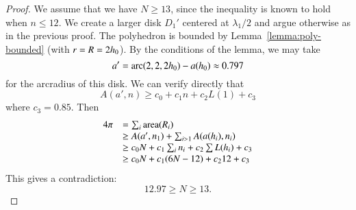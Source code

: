 \begin{proof}  We assume that we have $N\ge 13$, since the inequality is known to hold when $n\le 12$.   We create a larger disk $D_1'$ centered at $\lambda_1/2$ and argue otherwise as in the previous proof.  The polyhedron is bounded by Lemma~\ref{lemma:poly-bounded} (with $r=R=2{h_0}$).  By the conditions of the lemma, we may take 
$$a'=\operatorname{arc}(2,2,2{h_0})-a({h_0}) \approx 0.797$$
for the arcradius of this disk.  We can verify directly that~\cite[cc:alin2]{hales:2009:nonlinear} %
$$A(a',n) \ge c_0 + c_1 n + c_2 L(1) + c_3$$
where $c_3 = 0.85$.
Then 
$$
\begin{array}{lll}
4\pi &= \sum_i{\operatorname{area}}(R_i)\\
     &\ge A(a',n_1)+\sum_{i>1} A(a(h_i),n_i) \\
     &\ge  c_0 N +c_1\sum_i n_i + c_2 \sum L(h_i) + c_3\\
     &\ge c_0 N +c_1 (6N-12) + c_2 12 + c_3\\
\end{array}
$$
This gives a contradiction:
$$
12.97 \ge N \ge 13.
$$
\end{proof}